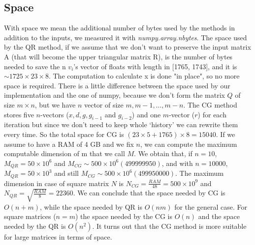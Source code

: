 \documentclass{article}
\begin{document}
\subsection{Space}\label{subsec:space}
With space we mean the additional number of bytes used by the methods in addition to the inputs, we measured it with \textit{numpy.array.nbytes}.
The space used by the QR method, if we assume that we don't want to preserve the input matrix A (that will become the upper triangular matrix R), is the number of bytes needed to save the n $v_{i}$'s vector of floats with length in [1765, 1743], and it is $\sim 1725 \times 23 \times 8$.
The computation to calculate x is done "in place", so no more space is required.
There is a little difference between the space used by our implementation and the one of numpy, because we don't form the matrix $Q$ of size $m \times n$, but we have $n$ vector of size $m, m-1, \dots, m-n$.
The CG method stores five $n$-vectors ($x, d, g, g_{i-1}$ and $g_{i-2}$) and one $m$-vector ($r$) for each iteration but since we don't need to keep whole ‘history’ we can rewrite them every time.
So the total space for CG is $(23\times5 + 1765)\times8 = 15040$.
If we assume to have a RAM of 4 GB and we fix $n$, we can compute the maximum computable dimension of m that we call $M$.
We obtain that, if $n=10$, $M_{QR} = 50 \times 10^{6}$ and $M_{CG}\sim 500 \times 10^{6} (499999950)$, and with $n=10000$, $M_{QR} = 50 \times 10^{3}$ and still $M_{CG} \sim 500\times 10^{6} (499950000)$.
The maximum dimension in case of square matrix $N$ is $N_{CG} = \frac{RAM}{48} = 500 \times 10^{9}$ and $N_{QR} = \sqrt{\frac{RAM}{8}} = 22360$.
We can conclude that the space needed by CG is $O(n+m)$, while the space needed by QR is $O(nm)$ for the general case. For square matrices ($n=m$) the space needed by the CG is $O(n)$ and the space needed by the QR is $O(n^{2})$. It turns out that the CG method is more suitable for large matrices in terms of space.
\end{document}
